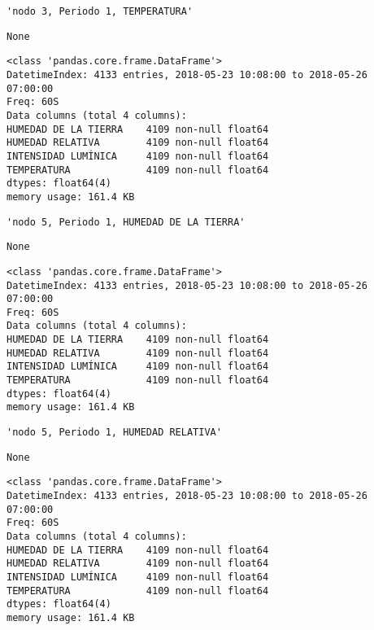 \documentclass[11pt]{article}
\begin{document}
    
    \begin{verbatim}
'nodo 3, Periodo 1, TEMPERATURA'
    \end{verbatim}

    
    
    \begin{verbatim}
None
    \end{verbatim}

    
    \begin{Verbatim}[commandchars=\\\{\}]
<class 'pandas.core.frame.DataFrame'>
DatetimeIndex: 4133 entries, 2018-05-23 10:08:00 to 2018-05-26 07:00:00
Freq: 60S
Data columns (total 4 columns):
HUMEDAD DE LA TIERRA    4109 non-null float64
HUMEDAD RELATIVA        4109 non-null float64
INTENSIDAD LUMÍNICA     4109 non-null float64
TEMPERATURA             4109 non-null float64
dtypes: float64(4)
memory usage: 161.4 KB

    \end{Verbatim}

    
    \begin{verbatim}
'nodo 5, Periodo 1, HUMEDAD DE LA TIERRA'
    \end{verbatim}

    
    
    \begin{verbatim}
None
    \end{verbatim}

    
    \begin{Verbatim}[commandchars=\\\{\}]
<class 'pandas.core.frame.DataFrame'>
DatetimeIndex: 4133 entries, 2018-05-23 10:08:00 to 2018-05-26 07:00:00
Freq: 60S
Data columns (total 4 columns):
HUMEDAD DE LA TIERRA    4109 non-null float64
HUMEDAD RELATIVA        4109 non-null float64
INTENSIDAD LUMÍNICA     4109 non-null float64
TEMPERATURA             4109 non-null float64
dtypes: float64(4)
memory usage: 161.4 KB

    \end{Verbatim}

    
    \begin{verbatim}
'nodo 5, Periodo 1, HUMEDAD RELATIVA'
    \end{verbatim}

    
    
    \begin{verbatim}
None
    \end{verbatim}

    
    \begin{Verbatim}[commandchars=\\\{\}]
<class 'pandas.core.frame.DataFrame'>
DatetimeIndex: 4133 entries, 2018-05-23 10:08:00 to 2018-05-26 07:00:00
Freq: 60S
Data columns (total 4 columns):
HUMEDAD DE LA TIERRA    4109 non-null float64
HUMEDAD RELATIVA        4109 non-null float64
INTENSIDAD LUMÍNICA     4109 non-null float64
TEMPERATURA             4109 non-null float64
dtypes: float64(4)
memory usage: 161.4 KB

    \end{Verbatim}
\end{document}
